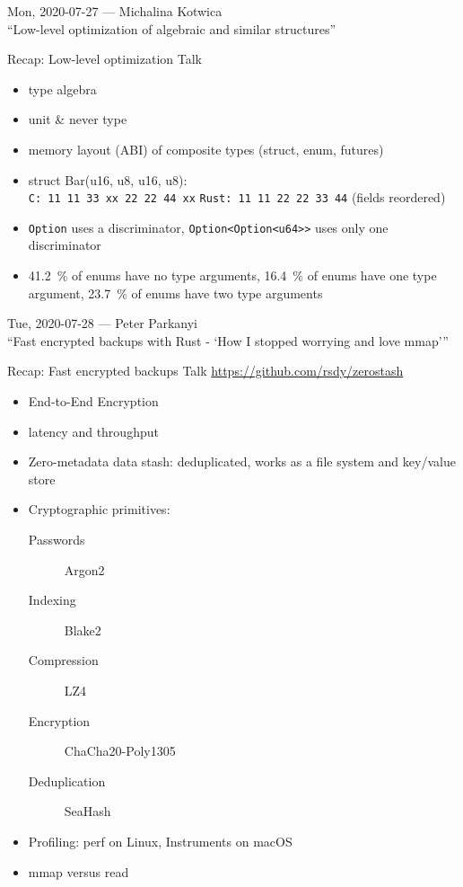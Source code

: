 \documentclass{beamer}
\begin{document}
\begin{frame}[standout]
  Mon, 2020-07-27 --- Michalina Kotwica \\
  \enquote{Low-level optimization of algebraic and similar structures}
\end{frame}

\begin{frame}[fragile]{Recap: Low-level optimization Talk}
  \begin{itemize}
    \item type algebra
    \item unit \& never type
    \item memory layout (ABI) of composite types (struct, enum, futures)
    \item struct Bar(u16, u8, u16, u8): \\
          \texttt{C:    11 11 33 xx 22 22 44 xx}
          \texttt{Rust: 11 11 22 22 33 44}  (fields reordered)
    \item \texttt{Option} uses a discriminator, \texttt{Option<Option<u64>>} uses only one discriminator
    \item 41.2~\% of enums have no type arguments, 16.4~\% of enums have one type argument, 23.7~\% of enums have two type arguments
  \end{itemize}
\end{frame}

\begin{frame}[standout]
  Tue, 2020-07-28 --- Peter Parkanyi \\
  \enquote{Fast encrypted backups with Rust - \enquote{How I stopped worrying and love mmap}}
\end{frame}

\begin{frame}[fragile]{Recap: Fast encrypted backups Talk}
  \url{https://github.com/rsdy/zerostash}
  \begin{itemize}
    \item End-to-End Encryption
    \item latency and throughput
    \item Zero-metadata data stash: deduplicated, works as a file system and key/value store
    \item Cryptographic primitives:
      \begin{description}
        \item[Passwords] Argon2
        \item[Indexing] Blake2
        \item[Compression] LZ4
        \item[Encryption] ChaCha20-Poly1305
        \item[Deduplication] SeaHash
      \end{description}
    \item Profiling: perf on Linux, Instruments on macOS
    \item mmap versus read
  \end{itemize}
\end{frame}
\end{document}
